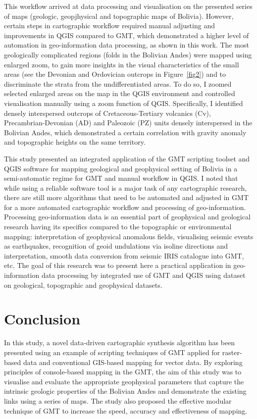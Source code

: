 \documentclass[data,article,submit,pdftex,moreauthors]{Definitions/mdpi}
\begin{document}
This workflow arrived at data processing and visualisation on the presented series of maps (geologic, geopjhysical and topographic maps of Bolivia). However, certain steps in cartographic workflow required manual adjusting and improvements in QGIS compared to GMT, which demonstrated a higher level of automation in geo-information data processing, as shown in this work. The most geologically complicated regions (folds in the Bolivian Andes) were mapped using enlarged zoom, to gain more insights in the visual characteristics of the small areas (see the Devonian and Ordovician outcrops in Figure~\ref{fig2}) and to discriminate the strata from the undifferentiated areas. To do so, I zoomed selected enlarged areas on the map in the QGIS environment and controlled visualisation manually using a zoom function of QGIS. Specifically, I identified densely interspersed outcrops of Cretaceous-Tertiary volcanics (Cv), Precambrian-Devonian (AD) and Paleozoic (PZ) units densely interspersed in the Bolivian Andes,  which demonstrated a certain correlation with gravity anomaly and topographic heights on the same territory. 

This study presented an integrated application of the GMT scripting toolset and QGIS software for mapping geological and geophysical setting of Bolivia in a semi-automatic regime for GMT and manual workflow in QGIS. I noted that while using a reliable software tool is a major task of any cartographic research, there are still more algorithms that need to be automated and adjusted in GMT for a more automated cartographic workflow and processing of geo-information. Processing geo-information data is an essential part of geophysical and geological research having its specifics compared to the topographic or environmental mapping: interpretation of geophysical anomalous fields, visualising seismic events as earthquakes, recognition of geoid undulations via isoline directions and interpretation, smooth data conversion from seismic IRIS catalogue into GMT, etc. The goal of this research was to present here a practical application in geo-information data processing by integrated use of GMT and QGIS using dataset on geological, topographic and geophysical datasets.

\section{Conclusion}

In this study, a novel data-driven cartographic synthesis algorithm has been presented using an example of scripting techniques of GMT applied for raster-based data and conventional GIS-based mapping for vector data. By exploring principles of console-based mapping in the GMT, the aim of this study was to visualise and evaluate the appropriate geophysical parameters that capture the intrinsic geologic properties of the Bolivian Andes and demonstrate the existing links using a series of maps. The study also proposed the effective modular technique of GMT to increase the speed, accuracy and effectiveness of mapping.
\end{document}
